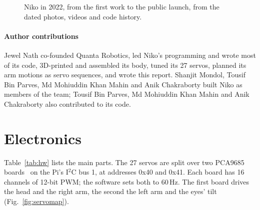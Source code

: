 \documentclass[11pt]{article}
\begin{document}
\begin{figure}[htbp]
  \centering
  \caption{Niko in 2022, from the first work to the public launch, from the dated photos, videos and code history.}
  \label{fig:timeline}
\end{figure}

\paragraph{Author contributions} Jewel Nath co-founded Quanta Robotics, led Niko's programming and wrote most of its code, 3D-printed and assembled its body, tuned its 27 servos, planned its arm motions as servo sequences, and wrote this report. Shanjit Mondol, Tousif Bin Parves, Md Mohiuddin Khan Mahin and Anik Chakraborty built Niko as members of the team; Tousif Bin Parves, Md Mohiuddin Khan Mahin and Anik Chakraborty also contributed to its code.

\section{Electronics}
\label{sec:electronics}

Table~\ref{tab:hw} lists the main parts. The 27 servos are split over two PCA9685 boards~\cite{pca9685} on the Pi's I$^2$C bus 1, at addresses 0x40 and 0x41. Each board has 16 channels of 12-bit PWM; the software sets both to 60\,Hz. The first board drives the head and the right arm, the second the left arm and the eyes' tilt (Fig.~\ref{fig:servomap}).
\end{document}
